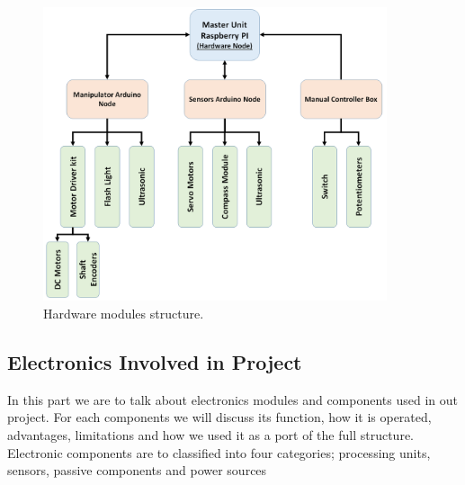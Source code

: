 \documentclass[12pt]{article}
\begin{document}
\begin{itemize}
	\begin{figure}[H]
		\centering
		\includegraphics[width =0.9\textwidth]{Fig/hardware-structure.png}
		\caption{Hardware modules structure.}
		\label{fig:harware-structure}
	\end{figure}

	
\end{itemize}
 
\newpage
\subsection{Electronics Involved in Project}
In this part we are to talk about electronics modules and components used in out project. For each components we will discuss its function, how it is operated, advantages, limitations and how we used it as a port of the full structure. Electronic components are to classified into four categories; processing units, sensors, passive components and power sources
\end{document}
